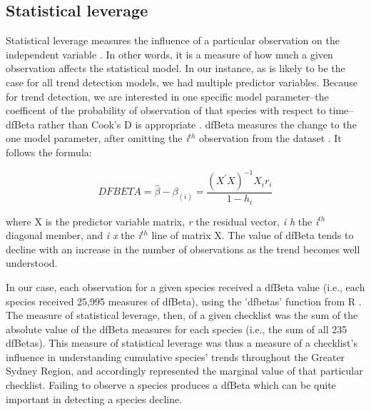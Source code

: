 \documentclass[9pt,twocolumn,twoside,lineno]{pnas-new}
\begin{document}
{\subsection*{Statistical leverage} Statistical leverage measures the influence of a particular observation on the independent variable \cite{cook1977detection}. In other words, it is a measure of how much a given observation affects the statistical model. In our instance, as is likely to be the case for all trend detection models, we had multiple predictor variables.  Because for trend detection, we are interested in one specific model parameter--the coefficent of the probability of observation of that species with respect to time--dfBeta rather than Cook's D is appropriate \citep{bollinger1981book}. dfBeta measures the change to the one model parameter, after omitting the \textit{i$^{th}$} observation from the dataset \cite{belsley1980regression, bollinger1981book}. It follows the formula:

\begin{equation}
D F B E T A=\hat{\beta}-\beta_{(i)}=\frac{\left(X^{\prime} X\right)^{-1} X_{i} r_{i}}{1-h_{i}}
\end{equation}

where X is the predictor variable matrix, \textit{r} the residual vector, \textit{i h} the \textit{i$^{th}$} diagonal member, and \textit{i x} the \textit{i$^{th}$} line of matrix X. The value of dfBeta tends to decline with an increase in the number of observations as the trend becomes well understood.

In our case, each observation for a given species received a dfBeta value (i.e., each species received 25,995 measures of dfBeta), using the 'dfbetas' function from R \cite{rcoreteam2018r}. The measure of statistical leverage, then, of a given checklist was the sum of the absolute value of the dfBeta measures for each species (i.e., the sum of all 235 dfBetas). This measure of statistical leverage was thus a measure of a checklist's influence in understanding cumulative species' trends throughout the Greater Sydney Region, and accordingly represented the marginal value of that particular checklist.  Failing to observe a species produces a dfBeta which can be quite important in detecting a species decline.  

}
\end{document}
